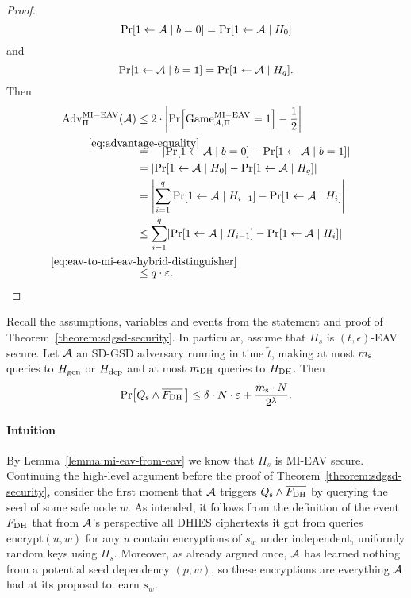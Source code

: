 \begin{proof}
	\[
		\pr{1 \from \adv \mid b = 0} = \pr{1 \from \adv \mid H_0}
	\]
	and
	\[
		\pr{1 \from \adv \mid b = 1} = \pr{1 \from \adv \mid H_q}.
	\]
	Then
	\begin{align*}
		\mathrm{Adv}_{\Pi}^{\mathrm{MI-EAV}}(\adv) & \le 2 \cdot \abs*{\pr{\mathrm{Game}_{\adv, \Pi}^{\mathrm{MI-EAV}} = 1} - \frac{1}{2}} \\
							   & \stackrel{\mathclap{\eqref{eq:advantage-equality}}}{=} \quad \abs*{\pr{1 \from \adv \mid b = 0} - \pr{1 \from \adv \mid b = 1}}                       \\
		                                           & = \abs*{\pr{1 \from \adv \mid H_0} - \pr{1 \from \adv \mid H_q}}                           \\
		                                           & = \abs*{\sum_{i = 1}^{q} \pr{1 \from \adv \mid H_{i - 1}} - \pr{1 \from \adv \mid H_i}}    \\
		                                           & \le \sum_{i = 1}^{q} \abs*{\pr{1 \from \adv \mid H_{i - 1}} - \pr{1 \from \adv \mid H_i}}  \\
		                                           & \stackrel{\mathclap{\eqref{eq:eav-to-mi-eav-hybrid-distinguisher}}}{\le} q \cdot \epsilon.
	\end{align*}
\end{proof}

\begin{lemma} \label{lemma:eav-reduction}
	Recall the assumptions, variables and events from the statement and proof of Theorem~\ref{theorem:sdgsd-security}. In particular, assume that $\Pi_s$ is $(t, \epsilon)$-EAV secure. Let $\mathcal{A}$ an SD-GSD adversary running in time $\tilde{t}$, making at most $m_\mathrm{s}$ queries to $H_\mathrm{gen}$ or $H_\mathrm{dep}$ and at most $m_\mathrm{DH}$ queries to $H_\mathrm{DH}$. Then
	\[
		\pr{\qs \land \overline{\fdh}\,} \le \delta \cdot N \cdot \epsilon + \frac{\ms \cdot N}{2^\lambda}.
	\]
\end{lemma}

\paragraph{Intuition} By Lemma~\vref{lemma:mi-eav-from-eav} we know that $\Pi_s$ is MI-EAV secure. Continuing the high-level argument before the proof of Theorem~\ref{theorem:sdgsd-security}, consider the first moment that $\mathcal{A}$ triggers $Q_\mathrm{s} \land \overline{F_\mathrm{DH}}$ by querying the seed of some safe node $w$.  As intended, it follows from the definition of the event $F_\mathrm{DH}$ that from $\mathcal{A}$'s perspective all DHIES ciphertexts it got from queries $\mathrm{encrypt}(u, w)$ for any $u$ contain encryptions of $s_w$ under independent, uniformly random keys using $\Pi_s$. Moreover, as already argued once, $\mathcal{A}$ has learned nothing from a potential seed dependency $(p, w)$, so these encryptions are everything $\mathcal{A}$ had at its proposal to learn $s_w$.

